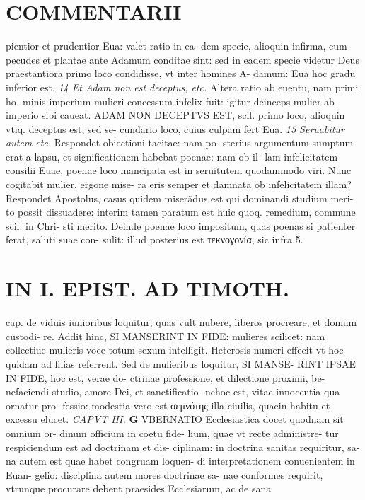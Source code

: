 \documentclass{article}
\begin{document}
\begin{pages}
\section*{COMMENTARII }\pstart pientior et prudentior Eua: valet ratio in ea- dem specie, alioquin infirma, cum pecudes et plantae ante Adamum conditae sint: sed in eadem specie videtur Deus praestantiora primo loco condidisse, vt inter homines A- damum: Eua hoc gradu inferior est.  \pend
\textit{14 Et Adam non est deceptus, etc. }\pstart Altera ratio ab euentu, nam primi ho- minis imperium mulieri concessum infelix fuit: igitur deinceps mulier ab imperio sibi caueat. ADAM NON DECEPTVS EST, scil. primo loco, alioquin vtiq. deceptus est, sed se- cundario loco, cuius culpam fert Eua.  \pend
\textit{15 Seruabitur autem etc. }\pstart Respondet obiectioni tacitae: nam po- sterius argumentum sumptum erat a lapsu, et significationem habebat poenae: nam ob il- lam infelicitatem consilii Euae, poenae loco mancipata est in seruitutem quodammodo viri. Nunc cogitabit mulier, ergone mise- ra eris semper et damnata ob infelicitatem illam? Respondet Apostolus, casus quidem miserãdus est qui dominandi studium meri- to possit dissuadere: interim tamen paratum est huic quoq. remedium, commune scil. in Chri- sti merito. Deinde poenae loco impositum, quas poenas si patienter ferat, saluti suae con- sulit: illud posterius est τεκνογονία, sic infra 5.  \pend
\section*{IN I. EPIST. AD TIMOTH. }
\marginpar{[ p.59 ]}\pstart cap. de viduis iunioribus loquitur, quas vult nubere, liberos procreare, et domum custodi- re. Addit hinc, SI MANSERINT IN FIDE: mulieres scilicet: nam collectiue mulieris voce totum sexum intelligit. Heterosis numeri effecit vt hoc quidam ad filias referrent. Sed de mulieribus loquitur, SI MANSE- RINT IPSAE IN FIDE, hoc est, verae do- ctrinae professione, et dilectione proximi, be- nefaciendi studio, amore Dei, et sanctificatio- nehoc est, vitae innocentia qua ornatur pro- fessio: modestia vero est σεμνότης illa ciuilis, quaein habitu et excessu elucet.  \pend
\textit{CAPVT III. }
\textbf{G }\pstart VBERNATIO Ecclesiastica docet quodnam sit omnium or- dinum officium in coetu fide- lium, quae vt recte administre- tur respiciendum est ad doctrinam et dis- ciplinam: in doctrina sanitas requiritur, sa- na autem est quae habet congruam loquen- di interpretationem conuenientem in Euan- gelio: disciplina autem mores doctrinae sa- nae conformes requirit, vtrunque procurare debent praesides Ecclesiarum, ac de sana  \pend
\marginpar{[ p.60 ]}

\end{pages}
\end{document}
